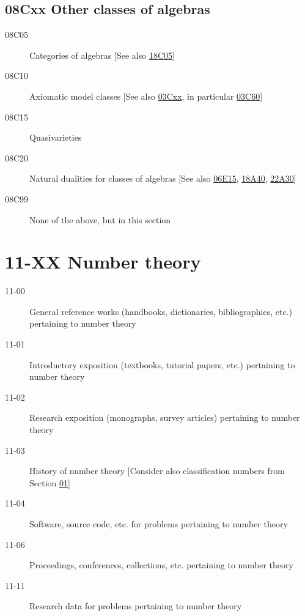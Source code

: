 \documentclass[letterpaper]{article}
\begin{document}
\subsection*{08Cxx  Other classes of algebras }\label{08Cxx}
\begin{description}  
\item [08C05]\label{08C05} Categories of algebras [See also \hyperref[18C05]{18C05}]
\item [08C10]\label{08C10} Axiomatic model classes [See also \hyperref[03Cxx]{03Cxx}, in particular \hyperref[03C60]{03C60}]
\item [08C15]\label{08C15} Quasivarieties
\item [08C20]\label{08C20} Natural dualities for classes of algebras [See also \hyperref[06E15]{06E15}, \hyperref[18A40]{18A40}, \hyperref[22A30]{22A30}]
\item [08C99]\label{08C99} None of the above, but in this section
\end{description}
\section*{11-XX Number theory }\label{11-XX}
\begin{description}
\item [11-00]\label{11-00} General reference works (handbooks, dictionaries, bibliographies, etc.) pertaining to number theory
\item [11-01]\label{11-01} Introductory exposition (textbooks, tutorial papers, etc.) pertaining to number theory
\item [11-02]\label{11-02} Research exposition (monographs, survey articles) pertaining to number theory
\item [11-03]\label{11-03} History of number theory [Consider also classification numbers from Section \hyperref[01-XX]{01}]
\item [11-04]\label{11-04} Software, source code, etc. for problems pertaining to number theory
\item [11-06]\label{11-06} Proceedings, conferences, collections, etc. pertaining to number theory
\item [11-11]\label{11-11} Research data for problems pertaining to number theory
\end{description}
\end{document}
